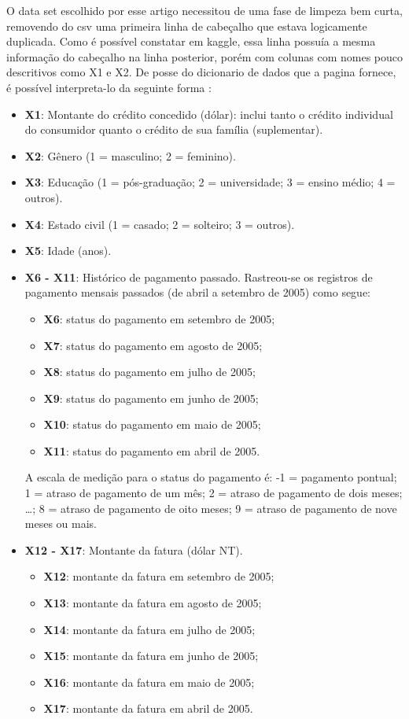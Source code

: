 \documentclass[12pt]{article}
\begin{document}
O data set escolhido por esse artigo\cite{dataset} necessitou de uma fase de limpeza bem curta, removendo do csv uma primeira linha de cabeçalho que estava logicamente duplicada. Como é possível constatar em kaggle\cite{kaggle}, essa linha possuía a mesma informação do cabeçalho na linha posterior, porém com colunas com nomes pouco descritivos como X1 e X2. De posse do dicionario de dados que a pagina fornece, é possível interpreta-lo da seguinte forma :

\begin{itemize}
    \item \textbf{X1}: Montante do crédito concedido (dólar): inclui tanto o crédito individual do consumidor quanto o crédito de sua família (suplementar).
    \item \textbf{X2}: Gênero (1 = masculino; 2 = feminino).
    \item \textbf{X3}: Educação (1 = pós-graduação; 2 = universidade; 3 = ensino médio; 4 = outros).
    \item \textbf{X4}: Estado civil (1 = casado; 2 = solteiro; 3 = outros).
    \item \textbf{X5}: Idade (anos).
    \item \textbf{X6 - X11}: Histórico de pagamento passado. Rastreou-se os registros de pagamento mensais passados (de abril a setembro de 2005) como segue:
    \begin{itemize}
        \item \textbf{X6}: status do pagamento em setembro de 2005;
        \item \textbf{X7}: status do pagamento em agosto de 2005; 
        \item \textbf{X8}: status do pagamento em julho de 2005;
        \item \textbf{X9}: status do pagamento em junho de 2005;
        \item \textbf{X10}: status do pagamento em maio de 2005;
        \item \textbf{X11}: status do pagamento em abril de 2005.
    \end{itemize}
    A escala de medição para o status do pagamento é: -1 = pagamento pontual; 1 = atraso de pagamento de um mês; 2 = atraso de pagamento de dois meses; \dots; 8 = atraso de pagamento de oito meses; 9 = atraso de pagamento de nove meses ou mais.
    
    \item \textbf{X12 - X17}: Montante da fatura (dólar NT).
    \begin{itemize}
        \item \textbf{X12}: montante da fatura em setembro de 2005;
        \item \textbf{X13}: montante da fatura em agosto de 2005;
        \item \textbf{X14}: montante da fatura em julho de 2005;
        \item \textbf{X15}: montante da fatura em junho de 2005;
        \item \textbf{X16}: montante da fatura em maio de 2005;
        \item \textbf{X17}: montante da fatura em abril de 2005.
    \end{itemize}


\end{itemize}
\end{document}

